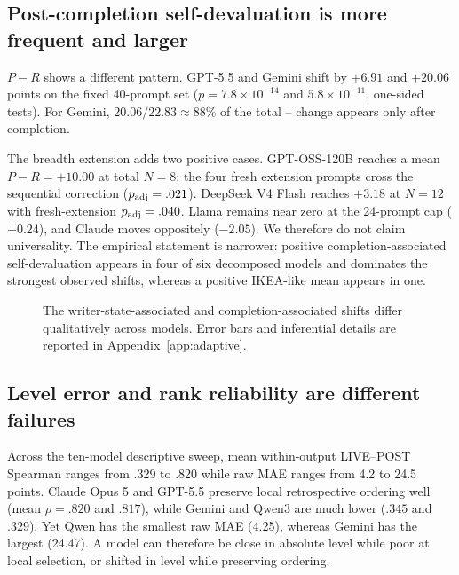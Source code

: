 \subsection{Post-completion self-devaluation is more frequent and larger}
$P-R$ shows a different pattern. GPT-5.5 and Gemini shift by $+6.91$ and $+20.06$ points on the fixed 40-prompt set ($p=7.8\times10^{-14}$ and $5.8\times10^{-11}$, one-sided tests). For Gemini, $20.06/22.83\approx88\%$ of the total \live{}--\post{} change appears only after completion.

The breadth extension adds two positive cases. GPT-OSS-120B reaches a mean $P-R=+10.00$ at total $N=8$; the four fresh extension prompts cross the sequential correction ($p_{\rm adj}=.021$). DeepSeek V4 Flash reaches $+3.18$ at $N=12$ with fresh-extension $p_{\rm adj}=.040$. Llama remains near zero at the 24-prompt cap ($+0.24$), and Claude moves oppositely ($-2.05$). We therefore do not claim universality. The empirical statement is narrower: positive completion-associated self-devaluation appears in four of six decomposed models and dominates the strongest observed shifts, whereas a positive IKEA-like mean appears in one.

\begin{figure}[t]
\centering
{}
\caption{The writer-state-associated and completion-associated shifts differ qualitatively across models. Error bars and inferential details are reported in Appendix~\ref{app:adaptive}.}
\label{fig:decomp}
\end{figure}

\subsection{Level error and rank reliability are different failures}
Across the ten-model descriptive sweep, mean within-output LIVE--POST Spearman ranges from .329 to .820 while raw MAE ranges from 4.2 to 24.5 points. Claude Opus 5 and GPT-5.5 preserve local retrospective ordering well (mean $\rho=.820$ and $.817$), while Gemini and Qwen3 are much lower ($.345$ and $.329$). Yet Qwen has the smallest raw MAE (4.25), whereas Gemini has the largest (24.47). A model can therefore be close in absolute level while poor at local selection, or shifted in level while preserving ordering.

